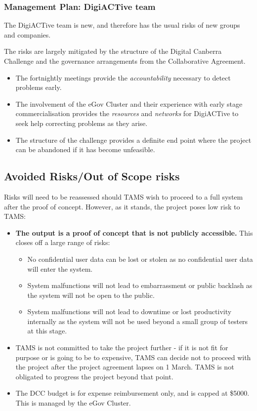 \documentclass[12pt,a4paper,twosided]{article}
\begin{document}
\subsubsection{Management Plan: DigiACTive team}

The DigiACTive team is new, and therefore has the usual risks of new
groups and companies.

The risks are largely mitigated by the structure of the Digital Canberra
Challenge and the governance arrangements from the Collaborative
Agreement.

\begin{itemize}
\itemsep1pt\parskip0pt
\item
  The fortnightly meetings provide the \emph{accountability} necessary
  to detect problems early.
\item
  The involvement of the eGov Cluster and their experience with early
  stage commercialisation provides the \emph{resources} and
  \emph{networks} for DigiACTive to seek help correcting problems as
  they arise.
\item
  The structure of the challenge provides a definite end point where the
  project can be abandoned if it has become unfeasible.
\end{itemize}

\subsection{Avoided Risks/Out of Scope risks}

Risks will need to be reassessed should TAMS wish to proceed to a full
system after the proof of concept. However, as it stands, the project
poses low risk to TAMS:

\begin{itemize}
\itemsep1pt\parskip0pt
\item
  \textbf{The output is a proof of concept that is not publicly
  accessible.} This closes off a large range of risks:

  \begin{itemize}
  \itemsep1pt\parskip0pt
  \item
    No confidential user data can be lost or stolen as no confidential
    user data will enter the system.
  \item
    System malfunctions will not lead to embarrassment or public
    backlash as the system will not be open to the public.
  \item
    System malfunctions will not lead to downtime or lost productivity
    internally as the system will not be used beyond a small group of
    testers at this stage.
  \end{itemize}
\item
  TAMS is not committed to take the project further - if it is not fit
  for purpose or is going to be to expensive, TAMS can decide not to
  proceed with the project after the project agreement lapses on 1
  March. TAMS is not obligated to progress the project beyond that
  point.
\item
  The DCC budget is for expense reimbursement only, and is capped at
  \$5000. This is managed by the eGov Cluster.
\end{itemize}
\end{document}
